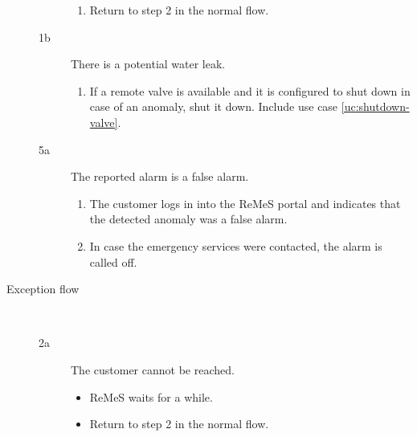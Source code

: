 \begin{description}
\begin{description}
\begin{enumerate}
			\item Return to step 2 in the normal flow.
		\end{enumerate}
		\item[1b] There is a potential water leak.
		\begin{enumerate}
			\item If a remote valve is available and it is configured to shut down in
			case of an anomaly, shut it down. Include use case \ref{uc:shutdown-valve}.
		\end{enumerate} 
		\item[5a] The reported alarm is a false alarm.
		\begin{enumerate}
		  \item The customer logs in into the ReMeS portal and indicates that the detected anomaly was a false alarm.
		  \item In case the emergency services were contacted, the alarm is called
		  off.
		\end{enumerate}
	\end{description}
	\item[Exception flow] \ 
	\begin{description}
		\item[2a] The customer cannot be reached.
		\begin{itemize}
			\item ReMeS waits for a while.
			\item Return to step 2 in the normal flow. 
		\end{itemize}
	\end{description}
\end{description}